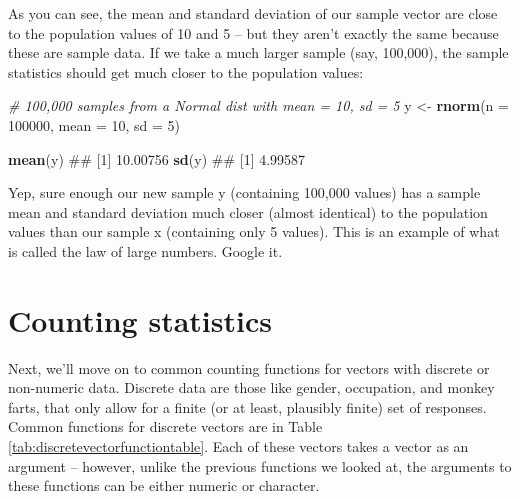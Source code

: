 \documentclass[]{book}
\newenvironment{Shaded}{\begin{snugshade}}{\end{snugshade}}
\newcommand{\KeywordTok}[1]{\textcolor[rgb]{0.13,0.29,0.53}{\textbf{#1}}}
\newcommand{\DataTypeTok}[1]{\textcolor[rgb]{0.13,0.29,0.53}{#1}}
\newcommand{\DecValTok}[1]{\textcolor[rgb]{0.00,0.00,0.81}{#1}}
\newcommand{\StringTok}[1]{\textcolor[rgb]{0.31,0.60,0.02}{#1}}
\newcommand{\CommentTok}[1]{\textcolor[rgb]{0.56,0.35,0.01}{\textit{#1}}}
\newcommand{\NormalTok}[1]{#1}
\theoremstyle{definition}
\theoremstyle{definition}
\theoremstyle{remark}
\begin{document}
As you can see, the mean and standard deviation of our sample vector are
close to the population values of 10 and 5 -- but they aren't exactly
the same because these are sample data. If we take a much larger sample
(say, 100,000), the sample statistics should get much closer to the
population values:

\begin{Shaded}
\begin{Highlighting}[]
\CommentTok{# 100,000 samples from a Normal dist with mean = 10, sd = 5}
\NormalTok{y <-}\StringTok{ }\KeywordTok{rnorm}\NormalTok{(}\DataTypeTok{n =} \DecValTok{100000}\NormalTok{, }\DataTypeTok{mean =} \DecValTok{10}\NormalTok{, }\DataTypeTok{sd =} \DecValTok{5}\NormalTok{)}

\KeywordTok{mean}\NormalTok{(y)}
\NormalTok{## [1] 10.00756}
\KeywordTok{sd}\NormalTok{(y)}
\NormalTok{## [1] 4.99587}
\end{Highlighting}
\end{Shaded}

Yep, sure enough our new sample y (containing 100,000 values) has a
sample mean and standard deviation much closer (almost identical) to the
population values than our sample x (containing only 5 values). This is
an example of what is called the law of large numbers. Google it.

\section{Counting statistics}\label{counting-statistics}

Next, we'll move on to common counting functions for vectors with
discrete or non-numeric data. Discrete data are those like gender,
occupation, and monkey farts, that only allow for a finite (or at least,
plausibly finite) set of responses. Common functions for discrete
vectors are in Table \ref{tab:discretevectorfunctiontable}. Each of
these vectors takes a vector as an argument -- however, unlike the
previous functions we looked at, the arguments to these functions can be
either numeric or character.
\end{document}
